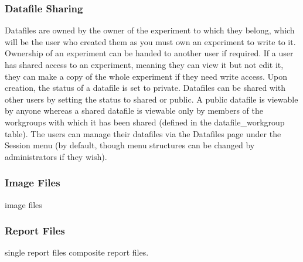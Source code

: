 

\subsubsection{Datafile Sharing}
Datafiles are owned by the owner of the experiment to which they belong, which will be the user who created them as you must own an experiment to write to it. Ownership of an experiment can be handed to another user if required. If a user has shared access to an experiment, meaning they can view it but not edit it, they can make a copy of the whole experiment if they need write access. Upon creation, the status of a datafile is set to private. Datafiles can be shared with other users by setting the status to shared or public. A public datafile is viewable by anyone whereas a shared datafile is viewable only by members of the workgroups with which it has been shared (defined in the datafile\_workgroup table). The users can manage their datafiles via the Datafiles page under the Session menu (by default, though menu structures can be changed by administrators if they wish). 


\subsubsection{Image Files}
image files

\subsubsection{Report Files}
single report files
composite report files.